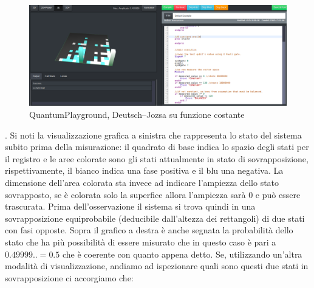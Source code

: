 \documentclass[12pt,a4paper,openright]{report}
\begin{document}
\begin{figure}[h]
    \centering
    \includegraphics[width=\textwidth,height=\textheight,keepaspectratio]{constantFunction}
    \caption{QuantumPlayground, Deutsch–Jozsa su funzione costante}
\end{figure}
. Si noti la visualizzazione grafica a sinistra che rappresenta lo stato del sistema subito prima della misurazione: il quadrato di base indica
lo spazio degli stati per il registro e le aree colorate sono gli stati attualmente in stato di sovrapposizione, rispettivamente,
il bianco indica una fase positiva e il blu una negativa. La dimensione dell'area colorata sta invece ad indicare l'ampiezza dello
stato sovrapposto, se è colorata solo la superfice allora l'ampiezza sarà 0 e può essere trascurata. Prima dell'osservazione
il sistema si trova quindi in una sovrapposizione equiprobabile (deducibile dall'altezza dei rettangoli) di due stati con fasi opposte.
Sopra il grafico a destra è anche segnata la probabilità dello stato che ha più possibilità di essere misurato che in questo caso
è pari a $0.49999..=0.5$ che è coerente con quanto appena detto. Se, utilizzando un'altra modalità di visualizzazione, andiamo
ad ispezionare quali sono questi due stati in sovrapposizione ci accorgiamo che: 
\end{document}
